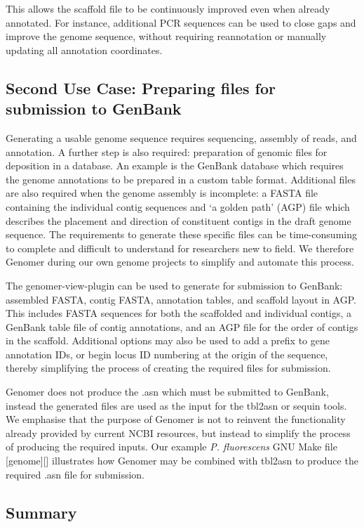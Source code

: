 \documentclass[10pt]{article}
\begin{document}
This allows the scaffold file to be continuously improved even when already
annotated. For instance, additional PCR sequences can be used to close gaps and
improve the genome sequence, without requiring reannotation or manually
updating all annotation coordinates.

\subsection*{Second Use Case: Preparing files for submission to GenBank}

Generating a usable genome sequence requires sequencing, assembly of reads, and
annotation. A further step is also required: preparation of genomic files for
deposition in a database. An example is the GenBank database which requires the
genome annotations to be prepared in a custom table format. Additional files
are also required when the genome assembly is incomplete: a FASTA file
containing the individual contig sequences and `a golden path' (AGP)
\cite{agp-spec} file which describes the placement and direction of constituent
contigs in the draft genome sequence. The requirements to generate these
specific files can be time-consuming to complete and difficult to understand
for researchers new to field. We therefore Genomer during our own genome
projects to simplify and automate this process.

The genomer-view-plugin can be used to generate for submission to GenBank:
assembled FASTA, contig FASTA, annotation tables, and scaffold layout in AGP.
This includes FASTA sequences for both the scaffolded and individual contigs, a
GenBank table file of contig annotations, and an AGP file for the order of
contigs in the scaffold. Additional options may also be used to add a prefix to
gene annotation IDs, or begin locus ID numbering at the origin of the sequence,
thereby simplifying the process of creating the required files for submission.

Genomer does not produce the .asn which must be submitted to GenBank, instead
the generated files are used as the input for the tbl2asn or sequin tools. We
emphasise that the purpose of Genomer is not to reinvent the functionality
already provided by current NCBI resources, but instead to simplify the process
of producing the required inputs. Our example \emph{P. fluorescens} GNU Make
file [genome][] illustrates how Genomer may be combined with tbl2asn to produce
the required .asn file for submission.

\subsection*{Summary}
\end{document}
